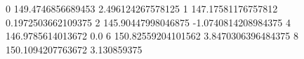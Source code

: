 0 149.4746856689453 2.496124267578125
1 147.17581176757812 0.1972503662109375
2 145.90447998046875 -1.0740814208984375
4 146.9785614013672 0.0
6 150.82559204101562 3.8470306396484375
8 150.1094207763672 3.130859375
